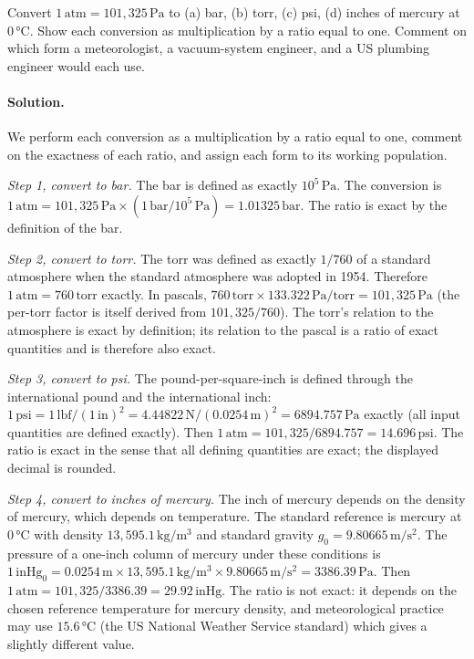 \begin{exercise}
Convert $1\,\text{atm} = 101{,}325 \,\si{\pascal}$ to (a) bar,
(b) torr, (c) psi, (d) inches of mercury at $0\,\si{\degreeCelsius}$.
Show each conversion as multiplication by a ratio equal to one.
Comment on which form a meteorologist, a vacuum-system engineer, and
a US plumbing engineer would each use.

\paragraph{Solution.}
We perform each conversion as a multiplication by a ratio equal to
one, comment on the exactness of each ratio, and assign each form to
its working population.

\textit{Step 1, convert to bar.} The bar is defined as exactly
$10^{5} \,\si{\pascal}$. The conversion is
$1 \,\text{atm} = 101{,}325 \,\si{\pascal} \times (1 \,\text{bar} /
10^{5} \,\si{\pascal}) = 1.01325 \,\text{bar}$. The ratio is exact
by the definition of the bar.

\textit{Step 2, convert to torr.} The torr was defined as exactly
$1/760$ of a standard atmosphere when the standard atmosphere was
adopted in 1954. Therefore $1 \,\text{atm} = 760 \,\text{torr}$
exactly. In pascals, $760 \,\text{torr} \times 133.322 \,\si{\pascal}
/\text{torr} = 101{,}325 \,\si{\pascal}$ (the per-torr factor is
itself derived from $101{,}325 / 760$). The torr's relation to the
atmosphere is exact by definition; its relation to the pascal is a
ratio of exact quantities and is therefore also exact.

\textit{Step 3, convert to psi.} The pound-per-square-inch is defined
through the international pound and the international inch:
$1 \,\text{psi} = 1 \,\text{lbf}/(1 \,\text{in})^{2} = 4.44822
\,\si{\newton}/(0.0254 \,\si{\meter})^{2} = 6894.757 \,\si{\pascal}$
exactly (all input quantities are defined exactly). Then
$1 \,\text{atm} = 101{,}325 / 6894.757 = 14.696 \,\text{psi}$. The
ratio is exact in the sense that all defining quantities are exact;
the displayed decimal is rounded.

\textit{Step 4, convert to inches of mercury.} The inch of mercury
depends on the density of mercury, which depends on temperature.
The standard reference is mercury at $0 \,\si{\degreeCelsius}$ with
density $13{,}595.1 \,\si{\kilogram\per\meter\cubed}$ and standard
gravity $g_{0} = 9.80665 \,\si{\meter\per\second\squared}$. The
pressure of a one-inch column of mercury under these conditions is
$1 \,\text{inHg}_{0} = 0.0254 \,\si{\meter} \times 13{,}595.1
\,\si{\kilogram\per\meter\cubed} \times 9.80665 \,\si{\meter\per
\second\squared} = 3386.39 \,\si{\pascal}$. Then
$1 \,\text{atm} = 101{,}325 / 3386.39 = 29.92 \,\text{inHg}$. The
ratio is not exact: it depends on the chosen reference temperature
for mercury density, and meteorological practice may use
$15.6 \,\si{\degreeCelsius}$ (the US National Weather Service standard)
which gives a slightly different value.


\end{exercise}

